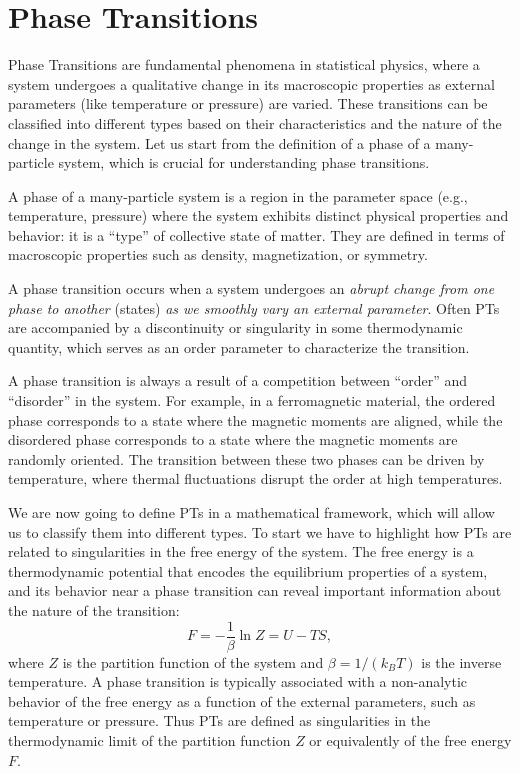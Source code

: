 \chapter{Phase Transitions}

Phase Transitions are fundamental phenomena in statistical physics, where a system undergoes a qualitative change in its macroscopic properties as external parameters (like temperature or pressure) are varied. These transitions can be classified into different types based on their characteristics and the nature of the change in the system. Let us start from the definition of a phase of a many-particle system, which is crucial for understanding phase transitions.

\begin{definition}
    A phase of a many-particle system is a region in the parameter space (e.g., temperature, pressure) where the system exhibits distinct physical properties and behavior: it is a ``type'' of collective state of matter. They are defined in terms of macroscopic properties such as density, magnetization, or symmetry.
\end{definition}

A phase transition occurs when a system undergoes an \textit{abrupt change from one phase to another} (states) \textit{as we smoothly vary an external parameter}. Often PTs are accompanied by a discontinuity or singularity in some thermodynamic quantity, which serves as an order parameter to characterize the transition.

A phase transition is always a result of a competition between ``order'' and ``disorder'' in the system. For example, in a ferromagnetic material, the ordered phase corresponds to a state where the magnetic moments are aligned, while the disordered phase corresponds to a state where the magnetic moments are randomly oriented. The transition between these two phases can be driven by temperature, where thermal fluctuations disrupt the order at high temperatures.

We are now going to define PTs in a mathematical framework, which will allow us to classify them into different types. To start we have to highlight how PTs are related to singularities in the free energy of the system. The free energy is a thermodynamic potential that encodes the equilibrium properties of a system, and its behavior near a phase transition can reveal important information about the nature of the transition:
\[
    F = -\frac{1}{\beta} \ln Z = U - TS,
\]
where $Z$ is the partition function of the system and $\beta = 1/(k_B T)$ is the inverse temperature. A phase transition is typically associated with a non-analytic behavior of the free energy as a function of the external parameters, such as temperature or pressure. Thus PTs are defined as singularities in the thermodynamic limit of the partition function $Z$ or equivalently of the free energy $F$.

